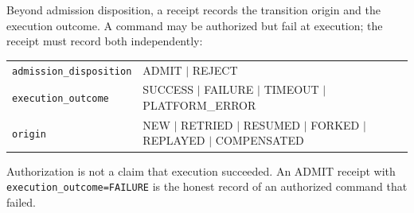 Beyond admission disposition, a receipt records the transition origin and
the execution outcome. A command may be authorized but fail at execution;
the receipt must record both independently:

\begin{center}
\begin{tabular}{ll}
\texttt{admission\_disposition} & ADMIT $\mid$ REJECT \\
\texttt{execution\_outcome} & SUCCESS $\mid$ FAILURE $\mid$ TIMEOUT $\mid$ PLATFORM\_ERROR \\
\texttt{origin} & NEW $\mid$ RETRIED $\mid$ RESUMED $\mid$ FORKED $\mid$ REPLAYED $\mid$ COMPENSATED \\
\end{tabular}
\end{center}

Authorization is not a claim that execution succeeded. An ADMIT receipt
with \texttt{execution\_outcome=FAILURE} is the honest record of an
authorized command that failed.
